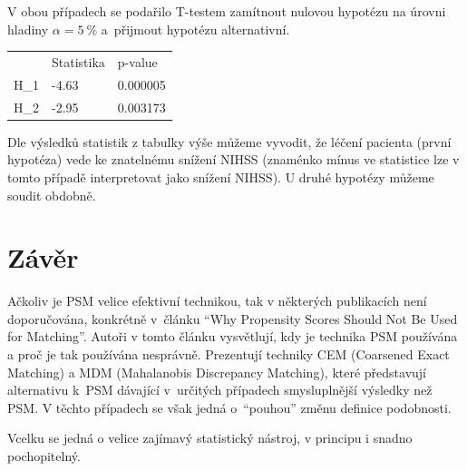 V obou případech se podařilo T-testem zamítnout nulovou hypotézu na úrovni hladiny \( \alpha = 5 \: \% \) a~přijmout hypotézu alternativní.

\begin{table}[htbp]
    \begin{tabular}{lll}
         & Statistika & p-value  \\
    H\_1 & -4.63      & 0.000005 \\
    H\_2 & -2.95      & 0.003173
    \end{tabular}
\end{table}
\FloatBarrier

Dle výsledků statistik z tabulky výše můžeme vyvodit, že léčení pacienta (první hypotéza) vede ke znatelnému snížení NIHSS (znaménko mínus ve statistice lze v tomto případě interpretovat jako snížení NIHSS).
U druhé hypotézy můžeme soudit obdobně.

\section{Závěr}

Ačkoliv je PSM velice efektivní technikou, tak v některých publikacích není doporučována, konkrétně v~článku \enquote{Why Propensity Scores Should Not Be Used for Matching}.
Autoři v tomto článku vysvětlují, kdy je technika PSM používána a proč je tak používána nesprávně.
Prezentují techniky CEM (Coarsened Exact Matching) a MDM (Mahalanobis Discrepancy Matching), které představují alternativu k~PSM dávající v~určitých případech smysluplnější výsledky než PSM.
V těchto případech se však jedná o~\enquote{pouhou} změnu definice podobnosti.

Vcelku se jedná o velice zajímavý statistický nástroj, v principu i snadno pochopitelný.
